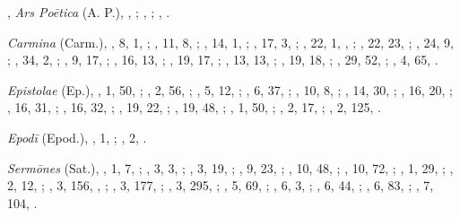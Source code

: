 \begin{autindex}
\indexspace

,
  \subitem \emph{Ars Poētica} (A. P.),
    , ;
    , ;
    , .

  \subitem \emph{Carmina} (Carm.),
    ,  8,  1, ;
    , 11,  8, ;
    , 14,  1, ;
    , 17,  3, ;
    , 22,  1, , ;
    , 22, 23, ;
    , 24,  9, ;
    , 34,  2, ;
    ,  9, 17, ;
    , 16, 13, ;
    , 19, 17, ;
    , 13, 13, ;
    , 19, 18, ;
    , 29, 52, ;
    ,  4, 65, .

  \subitem \emph{Epistolae} (Ep.),
    ,  1,  50, ;
    ,  2,  56, ;
    ,  5,  12, ;
    ,  6,  37, ;
    , 10,   8, ;
    , 14,  30, ;
    , 16,  20, ;
    , 16,  31, ;
    , 16,  32, ;
    , 19,  22, ;
    , 19,  48, ;
    ,  1,  50, ;
    ,  2,  17, ;
    ,  2, 125, .

  \subitem \emph{Epodī} (Epod.),
    , 1, ;
    , 2, .

  \subitem \emph{Sermōnes} (Sat.),
    ,  1,   7, ;
    ,  3,   3, ;
    ,  3,  19, ;
    ,  9,  23, ;
    , 10,  48, ;
    , 10,  72, ;
    ,  1,  29, ;
    ,  2,  12, ;
    ,  3, 156, , ;
    ,  3, 177, ;
    ,  3, 295, ;
    ,  5,  69, ;
    ,  6,   3, ;
    ,  6,  44, ;
    ,  6,  83, ;
    ,  7, 104, .

\indexspace


\end{autindex}
